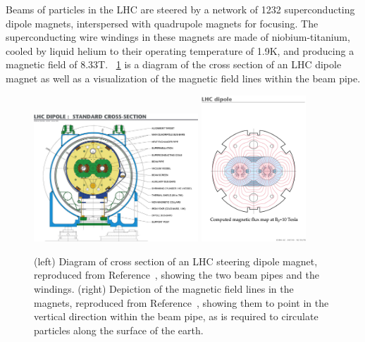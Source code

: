 Beams of particles in the LHC are steered by a network of 1232 superconducting dipole magnets, interspersed with quadrupole magnets for focusing.
The superconducting wire windings in these magnets are made of niobium-titanium, cooled by liquid helium to their operating temperature of 1.9\unit{K}, and producing a magnetic field of 8.33\unit{T}.
\Fig~\ref{cms:dipole} is a diagram of the cross section of an LHC dipole magnet as well as a visualization of the magnetic field lines within the beam pipe.

\begin{figure}[p]
  \centering
  \includegraphics[width=0.55\textwidth]{figures/cms/DipoleCrossSection.jpeg}
  \includegraphics[width=0.35\textwidth]{figures/cms/FieldLines.jpg}
  \caption[Diagram of cross section of an LHC steering dipole magnet and depiction of the magnetic field lines in the magnets.]{(left) Diagram of cross section of an LHC steering dipole magnet, reproduced from Reference~\cite{Team:40524}, showing the two beam pipes and the windings. (right) Depiction of the magnetic field lines in the magnets, reproduced from Reference~\cite{Jean-Luc:841503}, showing them to point in the vertical direction within the beam pipe, as is required to circulate particles along the surface of the earth.}
  \label{cms:dipole}
\end{figure}

